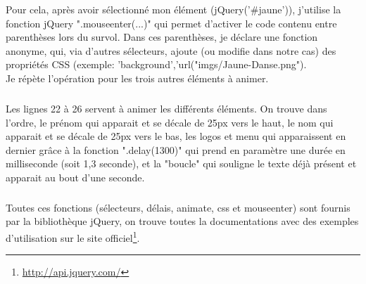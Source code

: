\documentclass[11pt,a4paper,twoside]{report}
\begin{document}
				Pour cela, après avoir sélectionné mon élément (jQuery('\#jaune')), j'utilise la fonction jQuery ".mouseenter(...)" qui permet d'activer le code contenu entre parenthèses lors du survol. Dans ces parenthèses, je déclare une fonction anonyme, qui, via d'autres sélecteurs, ajoute (ou modifie dans notre cas) des propriétés CSS (exemple: 'background','url("imgs/Jaune-Danse.png").\\
				Je répète l'opération pour les trois autres éléments à animer.
				\subparagraph*{}Les lignes 22 à 26 servent à animer les différents éléments. On trouve dans l'ordre, le prénom qui apparait et se décale de 25px vers le haut, le nom qui apparait et se décale de 25px vers le bas, les logos et menu qui apparaissent en dernier grâce à la fonction ".delay(1300)" qui prend en paramètre une durée en milliseconde (soit 1,3 seconde), et la "boucle" qui souligne le texte déjà présent et apparait au bout d'une seconde.
				\subparagraph*{}Toutes ces fonctions (sélecteurs, délais, animate, css et mouseenter) sont fournis par la bibliothèque jQuery, on trouve toutes la documentations avec des exemples d'utilisation sur le site officiel\footnote{\url{http://api.jquery.com/}}.
\end{document}
